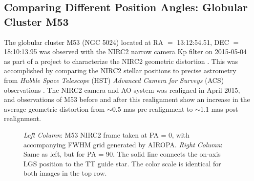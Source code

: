 \documentclass[]{spie}  %
\begin{document}
\subsection{Comparing Different Position Angles: Globular Cluster M53} \label{sec:m53-data}
The globular cluster M53 (NGC 5024) located at RA $=$ 13:12:54.51, DEC $=$ 18:10:13.95 was observed with the NIRC2 narrow camera Kp filter on 2015-05-04 as part of a project to characterize the NIRC2 geometric distortion \cite{service:2016a}. This was accomplished by comparing the NIRC2 stellar positions to precise astrometry from \textit{Hubble Space Telescope} (HST) \textit{Advanced Camera for Surveys} (ACS) observations \cite{anderson:2008a}. The NIRC2 camera and AO system was realigned in April 2015, and observations of M53 before and after this realignment show an increase in the average geometric distortion from $\sim$0.5 mas pre-realignment to $\sim$1.1 mas post-realignment.
\\
\begin{figure}[!h]
 \caption{\footnotesize \textit{Left Column}: M53 NIRC2 frame taken at PA = 0, with accompanying FWHM grid generated by AIROPA. \textit{Right Column}: Same as left, but for PA = 90. The solid line connects the on-axis LGS position to the TT guide star. The color scale is identical for both images in the top row.} \label{fig:m53_image_grid}
\end{figure}
\end{document}

